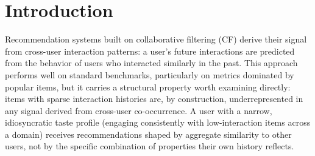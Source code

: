 \documentclass[11pt,a4paper]{article}
\begin{document}
\begin{abstract}
We report all primary baseline and stratification comparisons with paired bootstrap significance testing
($10{,}000$ resamples), Benjamini--Hochberg correction for multiple
comparisons, standardized effect sizes, and BCa robustness cross-checks ---
replacing an earlier confidence-interval-overlap methodology that does not
test the quantity of interest. We also report a popularity-decile breakdown
showing that Essence's long-tail advantage, where present, is concentrated
in moderately-rare-but-observed items rather than true cold-start items, and
an artist/author-identity shortcut analysis showing that a disproportionate
share of Essence's hits come from same-artist/author candidates despite
these being a minority of its recommendations. We frame Essence not as a
universally superior candidate generator, but as a data point on the
domain conditions under which peer-isolated, content-only personalization
is or isn't the right architectural choice.
Code and data: \url{https://github.com/biditdas18/essence}
\end{abstract}

\section{Introduction}

Recommendation systems built on collaborative filtering (CF) derive their
signal from cross-user interaction patterns: a user's future interactions are
predicted from the behavior of users who interacted similarly in the past.
This approach performs well on standard benchmarks, particularly on metrics
dominated by popular items, but it carries a structural property worth
examining directly: items with sparse interaction histories are, by
construction, underrepresented in any signal derived from cross-user
co-occurrence. A user with a narrow, idiosyncratic taste profile
(engaging consistently with low-interaction items across a domain) receives
recommendations shaped by aggregate similarity to other users, not by the
specific combination of properties their own history reflects.
\end{document}
